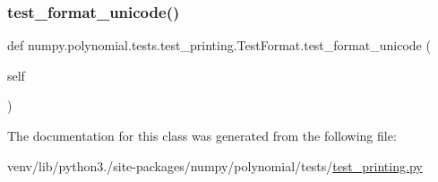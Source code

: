 \subsubsection{\texorpdfstring{test\+\_\+format\+\_\+unicode()}{test\_format\_unicode()}}
{\footnotesize\ttfamily def numpy.\+polynomial.\+tests.\+test\+\_\+printing.\+Test\+Format.\+test\+\_\+format\+\_\+unicode (\begin{DoxyParamCaption}\item[{}]{self }\end{DoxyParamCaption})}



The documentation for this class was generated from the following file\+:\begin{DoxyCompactItemize}
\item 
venv/lib/python3./site-\/packages/numpy/polynomial/tests/\hyperlink{test__printing_8py}{test\+\_\+printing.\+py}\end{DoxyCompactItemize}
